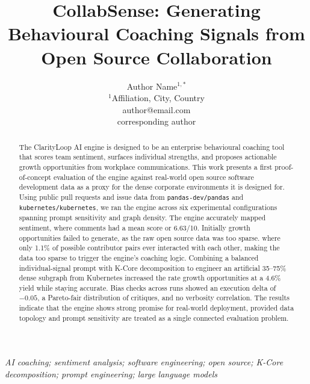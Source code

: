 \documentclass[conference]{IEEEconf}
\begin{document}
\title{\textbf{\Large CollabSense: Generating Behavioural Coaching Signals from Open Source Collaboration\\}}

\author{Author Name$^{1,*}$\\
	\normalsize $^{1}$Affiliation, City, Country\\
	\normalsize author@email.com\\
	\normalsize *corresponding author
}

\maketitle
\begin{abstract}
The ClarityLoop AI engine is designed to be an enterprise behavioural coaching tool that scores team sentiment, surfaces individual strengths, and proposes actionable growth opportunities from workplace communications. This work presents a first proof-of-concept evaluation of the engine against real-world open source software development data as a proxy for the dense corporate environments it is designed for. Using public pull requests and issue data from \texttt{pandas-dev/pandas} and \texttt{kubernetes/kubernetes}, we ran the engine across six experimental configurations spanning prompt sensitivity and graph density. The engine accurately mapped sentiment, where comments had a mean score or 6.63/10. Initially growth opportunities failed to generate, as the raw open source data was too sparse. where only 1.1\% of possible contributor pairs ever interacted with each other, making the data too sparse to trigger the engine's coaching logic. Combining a balanced individual-signal prompt with K-Core decomposition to engineer an artificial 35--75\% dense subgraph from Kubernetes increased the rate growth opportunities at a 4.6\% yield while staying accurate. Bias checks across runs showed an execution delta of $-0.05$, a Pareto-fair distribution of critiques, and no verbosity correlation. The results indicate that the engine shows strong promise for real-world deployment, provided data topology and prompt sensitivity are treated as a single connected evaluation problem.
\end{abstract}
\IEEEoverridecommandlockouts
\vspace{1.5ex}
\begin{keywords}
\itshape AI coaching; sentiment analysis; software engineering; open source; K-Core decomposition; prompt engineering; large language models
\end{keywords}
\end{document}
